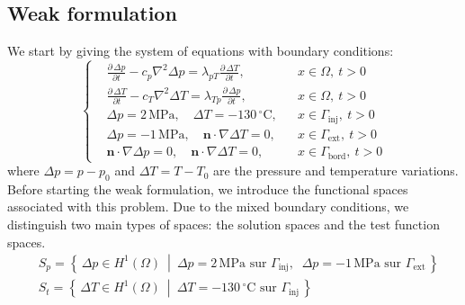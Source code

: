 \documentclass[a4paper,12pt]{report}
\begin{document}
\subsection{Weak formulation}
We start by giving the system of equations with boundary conditions:
\begin{equation}
\left\{
\begin{aligned}
    &\frac{\partial\, \Delta p}{\partial t} - c_p \nabla^2 \Delta p = \lambda_{pT} \frac{\partial\, \Delta T}{\partial t}, && x \in \Omega,\ t > 0 \\[2mm]
    &\frac{\partial\, \Delta T}{\partial t} - c_T \nabla^2 \Delta T = \lambda_{Tp} \frac{\partial\, \Delta p}{\partial t}, && x \in \Omega,\ t > 0 \\[2mm]
    &\Delta p = 2\,\text{MPa},\quad \Delta T = -130\,^\circ\text{C}, && x \in \Gamma_{\text{inj}},\ t > 0 \\[2mm]
    &\Delta p = -1\,\text{MPa},\quad \mathbf{n} \cdot \nabla \Delta T = 0, && x \in \Gamma_{\text{ext}},\ t > 0 \\[2mm]
    &\mathbf{n} \cdot \nabla \Delta p = 0,\quad \mathbf{n} \cdot \nabla \Delta T = 0, && x \in \Gamma_{\text{bord}},\ t > 0
\end{aligned}
\right.
\end{equation}
where $\Delta p = p - p_0$ and $\Delta T = T - T_0$ are the pressure and temperature variations.
Before starting the weak formulation, we introduce the functional spaces associated with this problem. Due to the mixed boundary conditions, we distinguish two main types of spaces: the solution spaces and the test function spaces.
\begin{equation}
\begin{aligned}
&S_p =  \left\{\, \Delta p \in H^1(\Omega)\ \middle|\ \Delta p = 2\,\text{MPa} \text{ sur } \Gamma_{\text{inj}},\;\; \Delta p = -1\,\text{MPa} \text{ sur } \Gamma_{\text{ext}}\, \right\} \\
&S_t =  \left\{\, \Delta T \in H^1(\Omega)\ \middle|\ \Delta T = -130\,^\circ\text{C} \text{ sur } \Gamma_{\text{inj}}\, \right\}
\end{aligned}
\end{equation}
\end{document}
